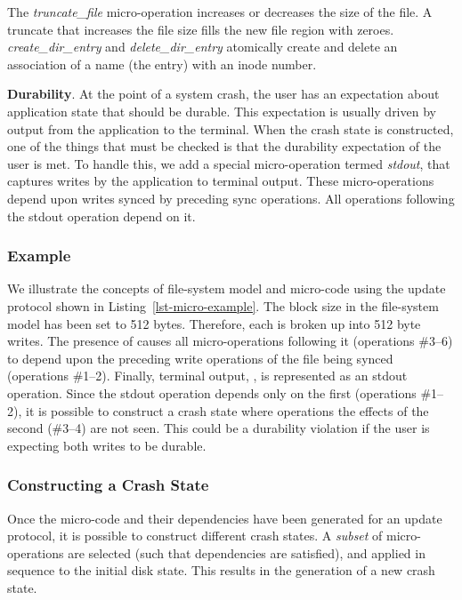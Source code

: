 The \textit{truncate\_file} micro-operation increases or decreases the size of
the file. A truncate that increases the file size fills the new file region
with zeroes.   \textit{create\_dir\_entry} and \textit{delete\_dir\_entry}
atomically create and delete an association of a name (the entry) with an inode
number.

\textbf{Durability}. At the point of a system crash, the user has an
expectation about application state that should be durable. This expectation is
usually driven by output from the application to the terminal. When the
crash state is constructed, one of the things that must be checked is that the
durability expectation of the user is met. To handle this, we add a special
micro-operation termed \textit{stdout}, that captures writes by the application
to terminal output. These micro-operations depend upon writes synced by
preceding sync operations. All operations following the stdout operation depend
on it.

\subsubsection{Example}
\label{sec-example}

We illustrate the concepts of file-system model and micro-code using the update
protocol shown in Listing~\ref{lst-micro-example}. The block size in the
file-system model has been set to 512 bytes. Therefore, each 
is broken up into 512 byte writes. The presence of  causes all
micro-operations following it (operations \#3--6) to depend upon the preceding
write operations of the file being synced (operations \#1--2). Finally,
terminal output, , is represented as an stdout
operation.  Since the stdout operation depends only on the first
 (operations \#1--2), it is possible to construct a crash
state where operations the effects of the second  (\#3--4) are
not seen.  This could be a durability violation if the user is expecting both
writes to be durable.



\subsubsection{Constructing a Crash State}
\label{sec-construct}

Once the micro-code and their dependencies have been generated for an update
protocol, it is possible to construct different crash states. A \textit{subset}
of micro-operations are selected (such that dependencies are satisfied),
and applied in sequence to the initial disk state. This results in the generation
of a new crash state.  


